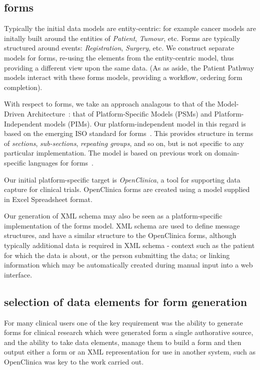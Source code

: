 \subsection{forms}

Typically the initial data models are entity-centric: for example
cancer models are initally built around the entities of
\emph{Patient}, \emph{Tumour}, etc.  Forms are typically structured around
events: \emph{Registration}, \emph{Surgery}, etc.  We construct
separate models for forms, re-using the elements from the
entity-centric model, thus providing a different view upon the same
data.  (As as aside, the Patient Pathway models interact with these
forms models, providing a workflow, ordering form completion).

With respect to forms, we take an approach analagous to that of the
Model-Driven Architecture~\cite{MDA-proposal}: that of
Platform-Specific Models (PSMs) and Platform-Independent models
(PIMs).  Our platform-independent model in this regard is based on the
emerging ISO standard for forms~\cite{ISOForms}.  This provides
structure in terms of \emph{sections}, \emph{sub-sections},
\emph{repeating groups}, and so on, but is not specific to any
particular implementation.  The model is based on previous work on
domain-specific languages for forms~\cite{Abler2011}.

Our initial platform-specific target is \emph{OpenClinica}, a tool for
supporting data capture for clinical trials.  OpenClinica forms are
created using a model supplied in Excel Spreadsheet format.

Our generation of XML schema may also be seen as a platform-specific
implementation of the forms model.  XML schema are used to define
message structures, and have a similar structure to the OpenClinica
forms, although typically additional data is required in XML schema -
context such as the patient for which the data is about, or the person
submitting the data; or linking information which may be automatically
created during manual input into a web interface. 


\subsection{selection of data elements for form generation}
For many clinical users one of the key requirement was the ability to generate forms for clinical research which were generated form a single authorative source, and the ability to take data elements, manage them to build a form and then output either a form or an XML representation for use in another system, such as OpenClinica was key to the work carried out. 



